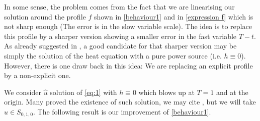 \documentclass[11pt,a4paper]{article}
\newcommand{\1}{\mathbbm{1}}
\numberwithin{equation}{section}
\theoremstyle{remark}
\begin{document}

In some sense, the problem comes from the fact that we are linearising our solution around the profile $f$ shown in \eqref{behaviour1} and in \eqref{expression f} which is not sharp enough (The error is in the slow variable scale). The idea is to replace this profile by a sharper version showing a smaller error in the fast variable $T-t$. As already suggested in \cite{Z2002}, a good candidate for that sharper version may be simply the solution of the heat equation with a pure power source (i.e. $h\equiv 0$). However, there is one draw back in this idea: We are replacing an explicit profile by a non-explicit one.

We consider $\hat u$ solution of \eqref{eq:1} with $h\equiv 0$ which blows up at $T=1$ and at the origin. Many proved the existence of such solution, we may cite \cite{MZ1997}, but we will take $u\in S_{0,1,0}$. The following result is our improvement of \eqref{behaviour1}.


\end{document}

